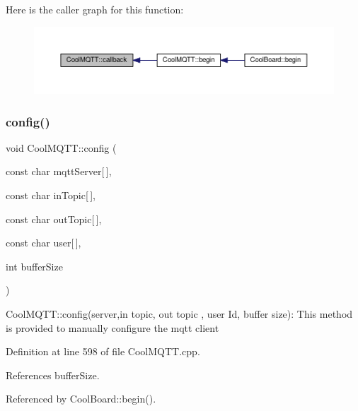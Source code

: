 Here is the caller graph for this function\+:\nopagebreak
\begin{figure}[H]
\begin{center}
\leavevmode
\includegraphics[width=350pt]{classCoolMQTT_a30d82ad665bfb603f46ecdbc290775df_icgraph}
\end{center}
\end{figure}
\mbox{\label{classCoolMQTT_a9b703de4f1358f0ee7a5e8c44979c648}} 
\subsubsection{\texorpdfstring{config()}{config()}\hspace{0.1cm}{\footnotesize\ttfamily [1/2]}}
{\footnotesize\ttfamily void Cool\+M\+Q\+T\+T\+::config (\begin{DoxyParamCaption}\item[{const char}]{mqtt\+Server\mbox{[}$\,$\mbox{]},  }\item[{const char}]{in\+Topic\mbox{[}$\,$\mbox{]},  }\item[{const char}]{out\+Topic\mbox{[}$\,$\mbox{]},  }\item[{const char}]{user\mbox{[}$\,$\mbox{]},  }\item[{int}]{buffer\+Size }\end{DoxyParamCaption})}

Cool\+M\+Q\+T\+T\+::config(server,in topic, out topic , user Id, buffer size)\+: This method is provided to manually configure the mqtt client 

Definition at line 598 of file Cool\+M\+Q\+T\+T.\+cpp.



References buffer\+Size.



Referenced by Cool\+Board\+::begin().


